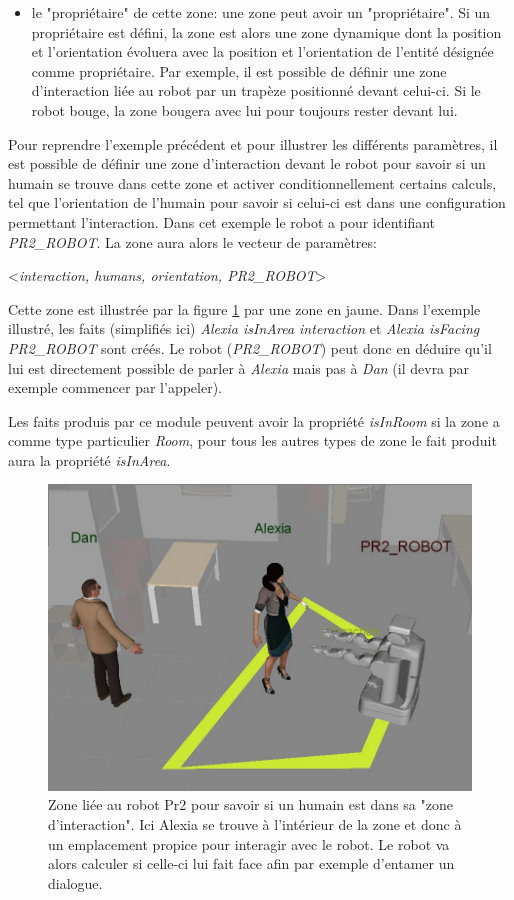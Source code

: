 \documentclass[a4paper,11pt,twoside]{StyleThese}
\begin{document}
\begin{itemize}
\item le "propriétaire" de cette zone: une zone peut avoir un "propriétaire". Si un propriétaire est défini, la zone est alors une zone dynamique dont la position et l'orientation évoluera avec la position et l'orientation de l'entité désignée comme propriétaire. Par exemple, il est possible de définir une zone d'interaction liée au robot par un trapèze positionné devant celui-ci. Si le robot bouge, la zone bougera avec lui pour toujours rester devant lui.
\end{itemize}

Pour reprendre l'exemple précédent et pour illustrer les différents paramètres, il est possible de définir une zone d'interaction devant le robot pour savoir si un humain se trouve dans cette zone et activer conditionnellement certains calculs, tel que l'orientation de l'humain pour savoir si celui-ci est dans une configuration permettant l'interaction.
Dans cet exemple le robot a pour identifiant \textit{PR2\_ROBOT}. La zone aura alors le vecteur de paramètres:
\begin{center}
<\textit{interaction, humans, orientation, PR2\_ROBOT}>
\end{center}
Cette zone est illustrée par la figure \ref{fig:interaction} par une zone en jaune.
Dans l'exemple illustré, les faits (simplifiés ici) \textit{Alexia isInArea interaction} et \textit{Alexia isFacing PR2\_ROBOT} sont créés. Le robot (\textit{PR2\_ROBOT}) peut donc en déduire qu'il lui est directement possible de parler à \textit{Alexia} mais pas à \textit{Dan} (il devra par exemple commencer par l'appeler).

Les faits produis par ce module peuvent avoir la propriété \textit{isInRoom} si la zone a comme type particulier \textit{Room}, pour tous les autres types de zone le fait produit aura la propriété \textit{isInArea}.


\begin{figure}[ht!]
 \centering
  \includegraphics[width=0.69\linewidth]{./img/interactionarea.jpg} 
    \caption {Zone liée au robot Pr2 pour savoir si un humain est dans sa "zone d'interaction". Ici Alexia se trouve à l'intérieur de la zone et donc à un emplacement propice pour interagir avec le robot. Le robot va alors calculer si celle-ci lui fait face afin par exemple d'entamer un dialogue.}
  \label{fig:interaction}
\end{figure}
\end{document}
